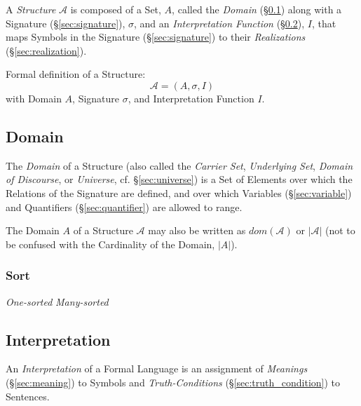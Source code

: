 A \emph{Structure} $\mathcal{A}$ is composed of a Set, $A$, called the
\emph{Domain} (\S\ref{sec:domain}) along with a Signature
(\S\ref{sec:signature}), $\sigma$, and an \emph{Interpretation
  Function} (\S\ref{sec:interpretation}), $I$, that maps Symbols in
the Signature (\S\ref{sec:signature}) to their \emph{Realizations}
(\S\ref{sec:realization}).

Formal definition of a Structure:
\[
    \mathcal{A} = (A, \sigma, I)
\]
with Domain $A$, Signature $\sigma$, and Interpretation Function $I$.



\subsection{Domain}\label{sec:domain}

The \emph{Domain} of a Structure (also called the \emph{Carrier Set},
\emph{Underlying Set}, \emph{Domain of Discourse}, or \emph{Universe},
cf. \S\ref{sec:universe}) is a Set of Elements over which the
Relations of the Signature are defined, and over which Variables
(\S\ref{sec:variable}) and Quantifiers (\S\ref{sec:quantifier}) are
allowed to range.

The Domain $A$ of a Structure $\mathcal{A}$ may also be written as
$dom(\mathcal{A})$ or $|\mathcal{A}|$ (not to be confused with the
Cardinality of the Domain, $|A|$).



\subsubsection{Sort}\label{sec:sort}

\emph{One-sorted} \emph{Many-sorted}



\subsection{Interpretation}\label{sec:interpretation}

An \emph{Interpretation} of a Formal Language is an assignment of
\emph{Meanings} (\S\ref{sec:meaning}) to Symbols and
\emph{Truth-Conditions} (\S\ref{sec:truth_condition}) to Sentences.

